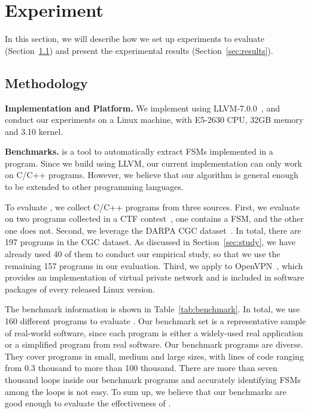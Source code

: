 \section{Experiment}
\label{sec:exp}

In this section, we will describe how we set up 
experiments to evaluate \Tool{} (Section~\ref{sec:meth}) 
and present the experimental results (Section~\ref{sec:results}). 

\subsection{Methodology}
\label{sec:meth}

\noindent\textbf{Implementation and Platform.} 
We implement \Tool{} using LLVM-7.0.0~\cite{LLVM}, 
and conduct our experiments on a Linux machine, 
with E5-2630 CPU, 32GB memory and 3.10 kernel. 

\noindent\textbf{Benchmarks.}
\Tool{} is a tool to automatically extract FSMs implemented in a program. 
Since we build \Tool{} using LLVM, 
our current implementation can only work on C/C++ programs.  
However, we believe that our algorithm is general enough 
to be extended to other programming languages. 


To evaluate \Tool{}, we collect C/C++ programs from three sources. 
First, we evaluate \Tool{} on two programs collected in a CTF contest~\cite{ctf}, 
one contains a FSM, and the other one does not. 
Second, we leverage the DARPA CGC dataset~\cite{CGC}. 
In total, there are 197 programs in the CGC dataset.
As discussed in Section~\ref{sec:study}, 
we have already used 40 of them to conduct our empirical study,
so that we use the remaining 157 programs in our evaluation.
Third, we apply \Tool{} to OpenVPN~\cite{openvpn}, 
which provides an implementation of virtual private network and 
is included in software packages of every released Linux version. 



The benchmark information is shown in Table~\ref{tab:benchmark}.
In total, we use 160 different programs to evaluate \Tool{}.
Our benchmark set is a representative sample of real-world software, 
since each program is either a widely-used real application or a simplified program
from real software. 
Our benchmark programs are diverse. 
They cover programs in small, medium and large sizes, 
with lines of code ranging from 0.3 thousand to more than 100 thousand.  
There are more than seven thousand 
loops inside our benchmark programs and accurately 
identifying FSMs among the loops is not easy. 
To sum up, we believe that our benchmarks are good 
enough to evaluate the effectiveness of \Tool{}.


